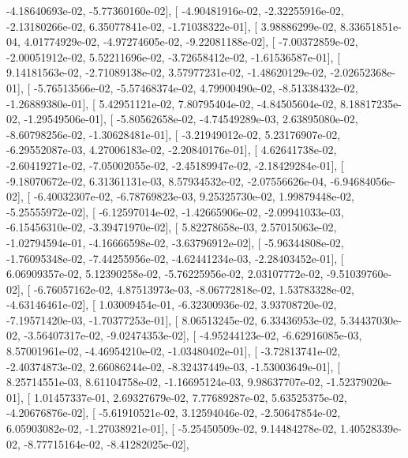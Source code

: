 \documentclass{article}
\begin{document}
         -4.18640693e-02,  -5.77360160e-02],
       [ -4.90481916e-02,  -2.32255916e-02,  -2.13180266e-02,
          6.35077841e-02,  -1.71038322e-01],
       [  3.98886299e-02,   8.33651851e-04,   4.01774929e-02,
         -4.97274605e-02,  -9.22081188e-02],
       [ -7.00372859e-02,  -2.00051912e-02,   5.52211696e-02,
         -3.72658412e-02,  -1.61536587e-01],
       [  9.14181563e-02,  -2.71089138e-02,   3.57977231e-02,
         -1.48620129e-02,  -2.02652368e-01],
       [ -5.76513566e-02,  -5.57468374e-02,   4.79900490e-02,
         -8.51338432e-02,  -1.26889380e-01],
       [  5.42951121e-02,   7.80795404e-02,  -4.84505604e-02,
          8.18817235e-02,  -1.29549506e-01],
       [ -5.80562658e-02,  -4.74549289e-03,   2.63895080e-02,
         -8.60798256e-02,  -1.30628481e-01],
       [ -3.21949012e-02,   5.23176907e-02,  -6.29552087e-03,
          4.27006183e-02,  -2.20840176e-01],
       [  4.62641738e-02,  -2.60419271e-02,  -7.05002055e-02,
         -2.45189947e-02,  -2.18429284e-01],
       [ -9.18070672e-02,   6.31361131e-03,   8.57934532e-02,
         -2.07556626e-04,  -6.94684056e-02],
       [ -6.40032307e-02,  -6.78769823e-03,   9.25325730e-02,
          1.99879448e-02,  -5.25555972e-02],
       [ -6.12597014e-02,  -1.42665906e-02,  -2.09941033e-03,
         -6.15456310e-02,  -3.39471970e-02],
       [  5.82278658e-03,   2.57015063e-02,  -1.02794594e-01,
         -4.16666598e-02,  -3.63796912e-02],
       [ -5.96344808e-02,  -1.76095348e-02,  -7.44255956e-02,
         -4.62441234e-03,  -2.28403452e-01],
       [  6.06909357e-02,   5.12390258e-02,  -5.76225956e-02,
          2.03107772e-02,  -9.51039760e-02],
       [ -6.76057162e-02,   4.87513973e-03,  -8.06772818e-02,
          1.53783328e-02,  -4.63146461e-02],
       [  1.03009454e-01,  -6.32300936e-02,   3.93708720e-02,
         -7.19571420e-03,  -1.70377253e-01],
       [  8.06513245e-02,   6.33436953e-02,   5.34437030e-02,
         -3.56407317e-02,  -9.02474353e-02],
       [ -4.95244123e-02,  -6.62916085e-03,   8.57001961e-02,
         -4.46954210e-02,  -1.03480402e-01],
       [ -3.72813741e-02,  -2.40374873e-02,   2.66086244e-02,
         -8.32437449e-03,  -1.53003649e-01],
       [  8.25714551e-03,   8.61104758e-02,  -1.16695124e-03,
          9.98637707e-02,  -1.52379020e-01],
       [  1.01457337e-01,   2.69327679e-02,   7.77689287e-02,
          5.63525375e-02,  -4.20676876e-02],
       [ -5.61910521e-02,   3.12594046e-02,  -2.50647854e-02,
          6.05903082e-02,  -1.27038921e-01],
       [ -5.25450509e-02,   9.14484278e-02,   1.40528339e-02,
         -8.77715164e-02,  -8.41282025e-02],
\end{document}
